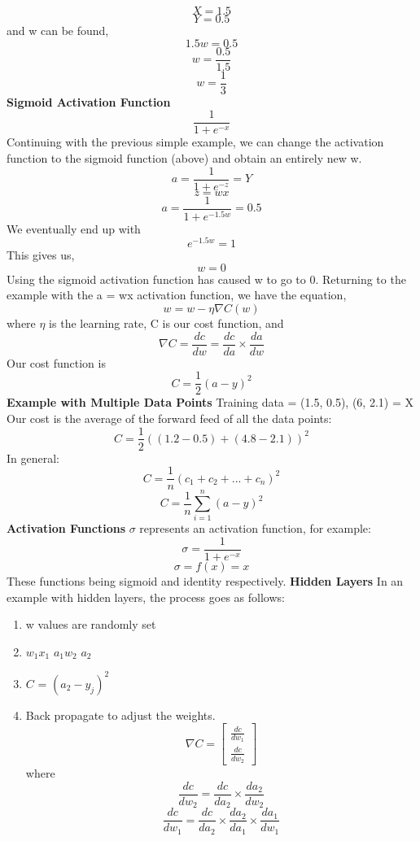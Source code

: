\[X = 1.5\]
\[Y = 0.5\]
and w can be found,
\[1.5w = 0.5\]
\[w = \frac{0.5}{1.5}\]
\[w = \frac{1}{3}\]
\textbf{Sigmoid Activation Function}
\vspace{5mm}
\[\frac{1}{1 + e^{-x}}\]
Continuing with the previous simple example, we can change the activation function to the sigmoid function (above) and obtain an entirely new w.
\[a = \frac{1}{1 + e^{-z}} = Y\]
\[z = wx\]
\[a = \frac{1}{1 + e^{-1.5w}} = 0.5\]
We eventually end up with
\[e^{-1.5w} = 1\]
This gives us,
\[w = 0\]
Using the sigmoid activation function has caused w to go to 0.
\vspace{5mm}
\newline
Returning to the example with the a = wx activation function, we have the equation,
\[w = w - \eta\nabla C(w)\]
where $\eta$ is the learning rate, C is our cost function, and \[\nabla C = \frac{dc}{dw} = \frac{dc}{da} \times \frac{da}{dw}\]
Our cost function is \[C = \frac{1}{2}(a-y)^2\]
\textbf{Example with Multiple Data Points}
\newline
Training data = {(1.5, 0.5), (6, 2.1)} = X
\newline
Our cost is the average of the forward feed of all the data points:
\[C = \frac{1}{2}((1.2 - 0.5) + (4.8 - 2.1))^2\]
In general:
\[C  = \frac{1}{n}(c_1+c_2+...+c_n)^2\]
\[C = \frac{1}{n}\sum_{i=1}^n (a - y)^2\]
\textbf{Activation Functions}
\newline
$\sigma$ represents an activation function, for example:
\[\sigma = \frac{1}{1 + e^{-x}}\]
\[\sigma = f(x) = x\]
These functions being sigmoid and identity respectively.
\vspace{5mm}
\newline
\textbf{Hidden Layers}
\newline
In an example with hidden layers, the process goes as follows:
\begin{enumerate}
    \item w values are randomly set
    \item $w_1x_1$ \rightarrow $a_1w_2$ \rightarrow $a_2$
    \item $C$ = $(a_2 - y_j)^2$
    \item Back propagate to adjust the weights. \[\nabla C = \begin{bmatrix}
        \frac{dc}{dw_1}\\ \frac{dc}{dw_2}
    \end{bmatrix}\]
    where 
    \[\frac{dc}{dw_2} = \frac{dc}{da_2} \times \frac{da_2}{dw_2}\]
    \[\frac{dc}{dw_1} = \frac{dc}{da_2} \times \frac{da_2}{da_1} \times \frac{da_1}{dw_1}\]
\end{enumerate}